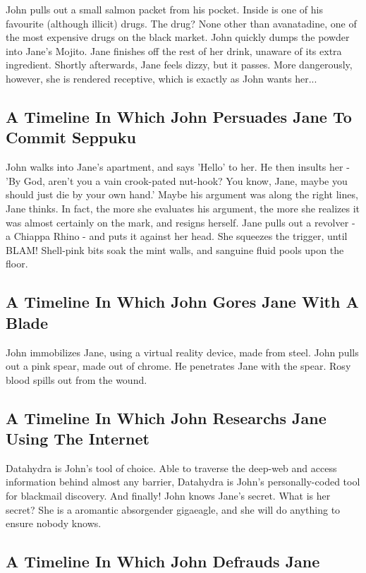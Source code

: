 \documentclass{article}
\begin{document}
John pulls out a small salmon packet from his pocket. Inside is one of his favourite (although illicit) drugs.
The drug? None other than avanatadine, one of the most expensive drugs on the black market.
John quickly dumps the powder into Jane's Mojito.
Jane finishes off the rest of her drink, unaware of its extra ingredient.
Shortly afterwards, Jane feels dizzy, but it passes.
More dangerously, however, she is rendered receptive, which is exactly as John wants her...
\subsection{A Timeline In Which John Persuades Jane To Commit Seppuku}


John walks into Jane's apartment, and says 'Hello' to her.
He then insults her {-} 'By God, aren't you a vain crook{-}pated nut{-}hook?
You know, Jane, maybe you should just die by your own hand.'
Maybe his argument was along the right lines, Jane thinks.
In fact, the more she evaluates his argument, the more she realizes it was almost certainly on the mark, and resigns herself.
Jane pulls out a revolver {-} a Chiappa Rhino {-} and puts it against her head.
She squeezes the trigger, until BLAM!
Shell{-}pink bits soak the mint walls, and sanguine fluid pools upon the floor.
\subsection{A Timeline In Which John Gores Jane With A Blade}


John immobilizes Jane, using a virtual reality device, made from steel.
John pulls out a pink spear, made out of chrome.
He penetrates Jane with the spear.
Rosy blood spills out from the wound.
\subsection{A Timeline In Which John Researchs Jane Using The Internet}


Datahydra is John's tool of choice. Able to traverse the deep{-}web and access information behind almost any barrier, Datahydra is John's personally{-}coded tool for blackmail discovery.
And finally!
John knows Jane's secret. What is her secret? She is a aromantic absorgender gigaeagle, and she will do anything to ensure nobody knows.
\subsection{A Timeline In Which John Defrauds Jane}
\end{document}
